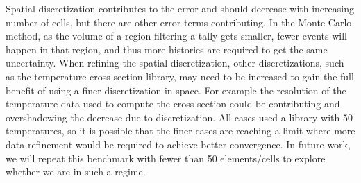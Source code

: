 \documentclass[letterpaper]{mc2023}
\begin{document}
Spatial discretization contributes to the error and should decrease with increasing number of cells, but there are other error terms contributing.
In the Monte Carlo method, as the volume of a region filtering a tally gets smaller, fewer events will happen in that region, and thus more histories
are required to get the same uncertainty. When refining the spatial discretization, other discretizations, such as the temperature cross section library,
may need to be increased to gain the full benefit of using a finer discretization in space. For example the resolution of the temperature data used to
compute the cross section could be contributing and overshadowing the decrease due to discretization. All cases used a library with $50$ temperatures,
so it is possible that the finer cases are reaching a limit where more data refinement would be required to achieve better convergence. In future work,
we will repeat this benchmark with fewer than 50 elements/cells to explore whether we are in such a regime.
\end{document}
